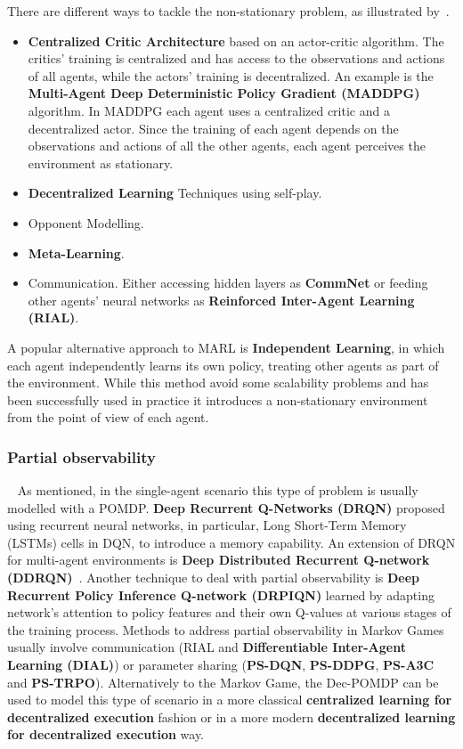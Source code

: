 \documentclass[11pt, a4paper, hidelinks]{report}
\begin{document}
There are different ways to tackle the non-stationary problem, as illustrated by~\cite{papoudakis2019dealing}.
\begin{itemize}
	\item \textbf{Centralized Critic Architecture} based on an actor-critic algorithm.
The critics' training is centralized and has access to the observations and actions of all agents, while the actors' training is decentralized.
An example is the \textbf{Multi-Agent Deep Deterministic Policy Gradient (MADDPG)} algorithm.
In MADDPG each agent uses a centralized critic and a decentralized actor.
Since the training of each agent depends on the observations and actions of all the other agents, each agent perceives the environment as stationary.
	\item \textbf{Decentralized Learning} Techniques using self-play.
	\item Opponent Modelling.
	\item \textbf{Meta-Learning}.
	\item Communication.
Either accessing hidden layers as \textbf{CommNet} or feeding other agents' neural networks as \textbf{Reinforced Inter-Agent Learning (RIAL)}.
\end{itemize}

A popular alternative approach to MARL is \textbf{Independent Learning}, in which each agent independently learns its own policy, treating other agents as part of the environment.
While this method avoid some scalability problems and has been successfully used in practice it introduces a non-stationary environment from the point of view of each agent.

\subsubsection{Partial observability}~\newline
As mentioned, in the single-agent scenario this type of problem is usually modelled with a POMDP\@.
\textbf{Deep Recurrent Q-Networks (DRQN)} proposed using recurrent neural networks, in particular, Long Short-Term Memory (LSTMs) cells in DQN, to introduce a memory capability.
An extension of DRQN for multi-agent environments is \textbf{Deep Distributed Recurrent Q-network (DDRQN)}~\cite{Nguyen_2020}.
Another technique to deal with partial observability is \textbf{Deep Recurrent Policy Inference Q-network (DRPIQN)} learned by adapting network’s attention to policy features and their own Q-values at various stages of the training process.
Methods to address partial observability in Markov Games usually involve communication (RIAL and \textbf{Differentiable Inter-Agent Learning (DIAL)}) or parameter sharing (\textbf{PS-DQN}, \textbf{PS-DDPG}, \textbf{PS-A3C} and \textbf{PS-TRPO}).
Alternatively to the Markov Game, the Dec-POMDP can be used to model this type of scenario in a more classical \textbf{centralized learning for decentralized execution} fashion or in a more modern \textbf{decentralized learning for decentralized execution} way.
\end{document}
